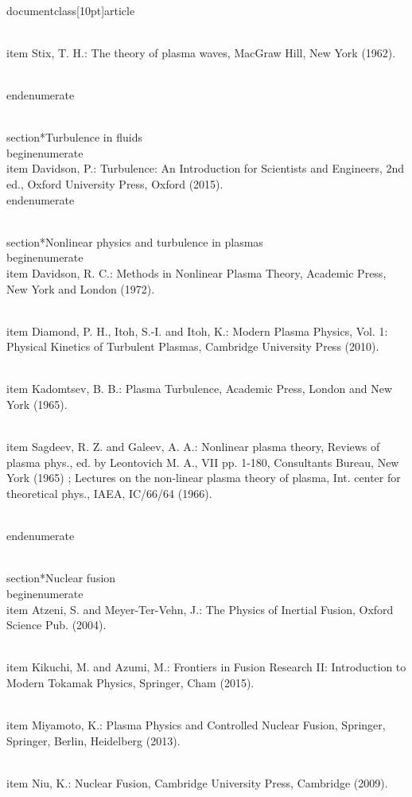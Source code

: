 \\documentclass[10pt]{article}
\begin{document}
{{{{{{  \\item Stix, T. H.: The theory of plasma waves, MacGraw Hill, New York (1962).

\\end{enumerate}

\\section*{Turbulence in fluids}
\\begin{enumerate}
  \\item Davidson, P.: Turbulence: An Introduction for Scientists and Engineers, 2nd ed., Oxford University Press, Oxford (2015).
\\end{enumerate}

\\section*{Nonlinear physics and turbulence in plasmas}
\\begin{enumerate}
  \\item Davidson, R. C.: Methods in Nonlinear Plasma Theory, Academic Press, New York and London (1972).

  \\item Diamond, P. H., Itoh, S.-I. and Itoh, K.: Modern Plasma Physics, Vol. 1: Physical Kinetics of Turbulent Plasmas, Cambridge University Press (2010).

  \\item Kadomtsev, B. B.: Plasma Turbulence, Academic Press, London and New York (1965).

  \\item Sagdeev, R. Z. and Galeev, A. A.: Nonlinear plasma theory, Reviews of plasma phys., ed. by Leontovich M. A., VII pp. 1-180, Consultants Bureau, New York (1965) ; Lectures on the non-linear plasma theory of plasma, Int. center for theoretical phys., IAEA, IC/66/64 (1966).

\\end{enumerate}

\\section*{Nuclear fusion}
\\begin{enumerate}
  \\item Atzeni, S. and Meyer-Ter-Vehn, J.: The Physics of Inertial Fusion, Oxford Science Pub. (2004).

  \\item Kikuchi, M. and Azumi, M.: Frontiers in Fusion Research II: Introduction to Modern Tokamak Physics, Springer, Cham (2015).

  \\item Miyamoto, K.: Plasma Physics and Controlled Nuclear Fusion, Springer, Springer, Berlin, Heidelberg (2013).

  \\item Niu, K.: Nuclear Fusion, Cambridge University Press, Cambridge (2009).

}}}}}}
\end{document}
